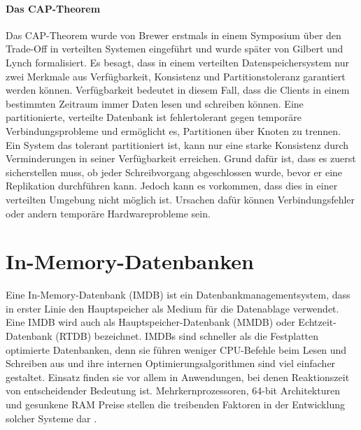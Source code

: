 \paragraph{Das CAP-Theorem} Das CAP-Theorem wurde von Brewer erstmals in einem Symposium \cite{cap2010} über den Trade-Off in verteilten Systemen eingeführt und wurde später von Gilbert und Lynch \cite{Gilbert:2002:BCF:564585.564601} formalisiert. Es besagt, dass in einem verteilten Datenspeichersystem nur zwei Merkmale aus Verfügbarkeit, Konsistenz und  Partitionstoleranz garantiert werden können. Verfügbarkeit bedeutet in diesem Fall, dass die Clients in einem bestimmten Zeitraum immer Daten lesen und schreiben können. Eine partitionierte, verteilte Datenbank ist fehlertolerant gegen temporäre Verbindungsprobleme und ermöglicht es, Partitionen über Knoten zu trennen. Ein System das tolerant partitioniert ist, kann nur eine starke Konsistenz durch Verminderungen in seiner Verfügbarkeit erreichen. Grund dafür ist, dass es zuerst sicherstellen muss, ob jeder Schreibvorgang abgeschlossen wurde, bevor er eine Replikation durchführen kann. Jedoch kann es vorkommen, dass dies in einer verteilten Umgebung nicht möglich ist. Ursachen dafür können Verbindungsfehler oder andern temporäre Hardwareprobleme sein.

\section{In-Memory-Datenbanken}
\label{ch:grundlagen:sec:InMemoryDatenbanken}

Eine In-Memory-Datenbank (IMDB) ist ein Datenbankmanagementsystem, dass in erster Linie den Hauptspeicher als Medium für die Datenablage verwendet. Eine IMDB wird auch als Hauptspeicher-Datenbank (MMDB) oder Echtzeit-Datenbank (RTDB) bezeichnet. IMDBs sind schneller als die Festplatten optimierte Datenbanken, denn sie führen weniger CPU-Befehle beim Lesen und Schreiben aus und ihre internen Optimierungsalgorithmen sind viel einfacher gestaltet. Einsatz finden sie vor allem in Anwendungen, bei denen Reaktionszeit von entscheidender Bedeutung ist. Mehrkernprozessoren, 64-bit Architekturen und gesunkene RAM Preise stellen die treibenden Faktoren in der Entwicklung solcher Systeme dar \cite{SWB-381840476}.

